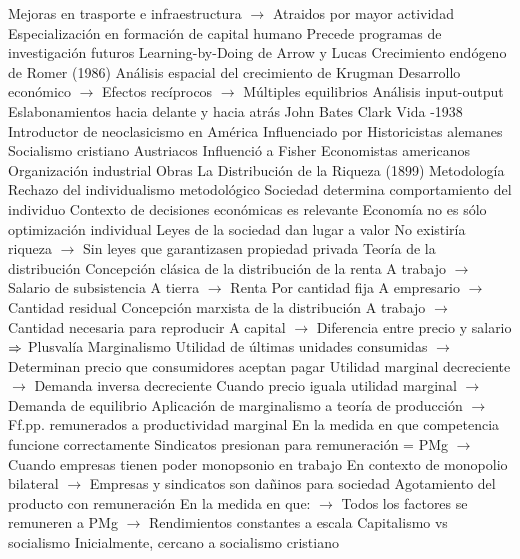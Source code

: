 \documentclass{nuevotema}
\begin{document}
\begin{esquemal}
				\4[] Mejoras en trasporte e infraestructura
				\4[] $\to$ Atraidos por mayor actividad
				\4[] Especialización en formación de capital humano
				\4 Precede programas de investigación futuros
				\4[] Learning-by-Doing de Arrow y Lucas
				\4[] Crecimiento endógeno de Romer (1986)
				\4[] Análisis espacial del crecimiento de Krugman
				\4[] Desarrollo económico
				\4[] $\to$ Efectos recíprocos
				\4[] $\to$ Múltiples equilibrios
				\4[] Análisis input-output
				\4[] Eslabonamientos hacia delante y hacia atrás
		\2 John Bates Clark
			\3 Vida
				-1938
				\4 Introductor de neoclasicismo en América
			\3 Influenciado por
				\4 Historicistas alemanes
				\4 Socialismo cristiano
				\4 Austriacos
			\3 Influenció a
				\4 Fisher
				\4 Economistas americanos
				\4 Organización industrial
			\3 Obras
				\4 La Distribución de la Riqueza (1899)
			\3 Metodología
				\4 Rechazo del individualismo metodológico
				\4 Sociedad determina comportamiento del individuo
				\4 Contexto de decisiones económicas es relevante
				\4[$\then$] Economía no es sólo optimización individual
				\4 Leyes de la sociedad dan lugar a valor
				\4[] No existiría riqueza
				\4[] $\to$ Sin leyes que garantizasen propiedad privada
			\3 Teoría de la distribución
				\4 Concepción clásica de la distribución de la renta
				\4[] A trabajo $\to$ Salario de subsistencia
				\4[] A tierra $\to$ Renta Por cantidad fija
				\4[] A empresario $\to$ Cantidad residual
				\4 Concepción marxista de la distribución
				\4[] A trabajo $\to$ Cantidad necesaria para reproducir
				\4[] A capital $\to$ Diferencia entre precio y salario
				\4[] $\then$ Plusvalía
				\4 Marginalismo
				\4[] Utilidad de últimas unidades consumidas
				\4[] $\to$ Determinan precio que consumidores aceptan pagar
				\4[] Utilidad marginal decreciente
				\4[] $\to$ Demanda inversa decreciente
				\4[] Cuando precio iguala utilidad marginal
				\4[] $\to$ Demanda de equilibrio
				\4[] Aplicación de marginalismo a teoría de producción
				\4[] $\to$
				\4 Ff.pp. remunerados a productividad marginal
				\4[] En la medida en que competencia funcione correctamente
				\4[] Sindicatos presionan para remuneración = PMg
				\4[] $\to$ Cuando empresas tienen poder monopsonio en trabajo
				\4[] En contexto de monopolio bilateral
				\4[] $\to$ Empresas y sindicatos son dañinos para sociedad
				\4 Agotamiento del producto con remuneración
				\4[] En la medida en que:
				\4[] $\to$ Todos los factores se remuneren a PMg
				\4[] $\to$ Rendimientos constantes a escala
			\3 Capitalismo vs socialismo
				\4 Inicialmente, cercano a socialismo cristiano

\end{esquemal}
\end{document}
